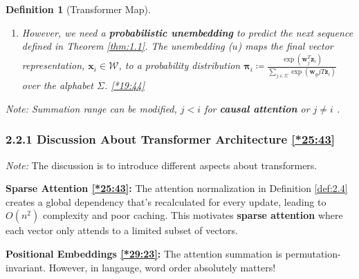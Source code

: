\documentclass[12pt, twoside]{article}
\theoremstyle{spaceddefn}
\newtheorem{definition}{Definition}[section]
\begin{document}
\begin{definition}[Transformer Map]
\begin{enumerate}
\begin{enumerate}
\item[{2.3}] However, we need a \textbf{probabilistic unembedding} to predict the next sequence defined in Theorem \ref{thm:1.1}. The unembedding ($u$) maps the final vector representation, $\mathbf{x}_i \in \mathcal{W}$, to a probability distribution $\mathbf{\pi}_i \coloneqq\frac{\exp(\mathbf{w}_{j}^T \mathbf{z}_i)}{\sum_{j \in \Sigma} \exp(\mathbf{w}_{g}jT \mathbf{z}_i)}$ over the alphabet $\Sigma$. \href{https://youtu.be/1u6h3Nm3NvM?si=le_Dg2Rl3Kr4Mv3s&t=1184}{[*19:44]}

    \end{enumerate}
\end{enumerate}
\textit{Note:} Summation range can be modified, $j < i$ for \textbf{causal attention} or $j \neq i$ .
\end{definition}

\subsubsection*{2.2.1 Discussion About Transformer Architecture \href{https://youtu.be/1u6h3Nm3NvM?si=cJQ1smjRAK88W2C7&t=1543}{[*25:43]}}

\textit{Note:} The discussion is to introduce different aspects about transformers.

\textbf{Sparse Attention \href{https://youtu.be/1u6h3Nm3NvM?si=cJQ1smjRAK88W2C7&t=1543}{[*25:43]}:} The attention normalization in Definition \ref{def:2.4} creates a global dependency that's recalculated for every update, leading to $O(n^2)$ complexity and poor caching. This motivates \textbf{sparse attention} where each vector only attends to a limited subset of vectors.

\textbf{Positional Embeddings \href{https://youtu.be/1u6h3Nm3NvM?si=MPObGmLgx7i59976&t=1763}{[*29:23]}:} The attention summation is permutation-invariant. However, in langauge, word order absolutely matters!
\end{document}
